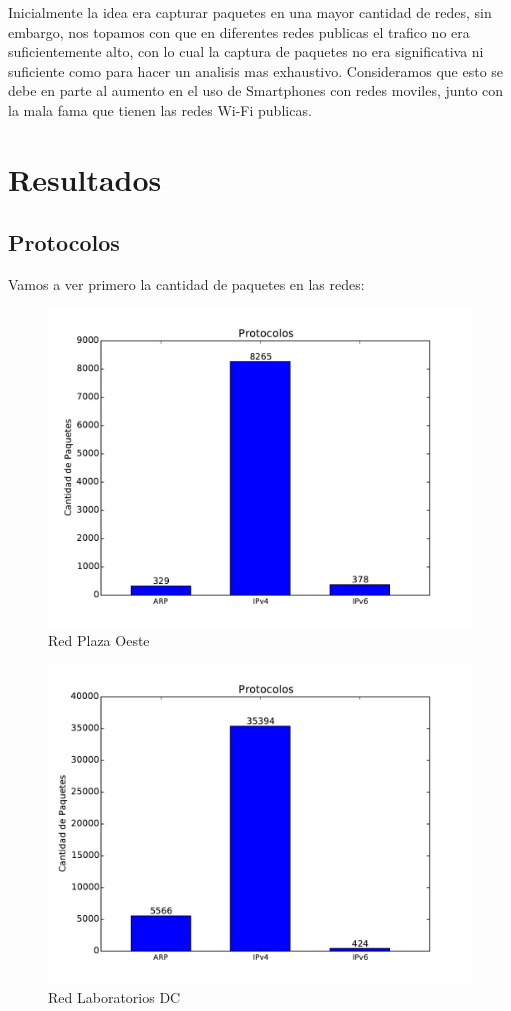Inicialmente la idea era capturar paquetes en una mayor cantidad de redes, sin embargo, nos topamos con que en diferentes redes publicas el trafico no era suficientemente alto, con lo cual la captura de paquetes no era significativa ni suficiente como para hacer un analisis mas exhaustivo. Consideramos que esto se debe en parte al aumento en el uso de Smartphones con redes moviles, junto con la mala fama que tienen las redes Wi-Fi publicas.

\section{Resultados}

\subsection{Protocolos}

Vamos a ver primero la cantidad de paquetes en las redes:

\begin{figure}[ht]
\begin{center}
\includegraphics[width=0.8\columnwidth]{graficos/plaza_s1.pdf}
\caption{Red Plaza Oeste}
\end{center}
\end{figure}

\begin{figure}[ht]
\begin{center}
\includegraphics[width=0.6\columnwidth]{graficos/dc_s1.pdf}
\caption{Red Laboratorios DC}
\end{center}
\end{figure}

